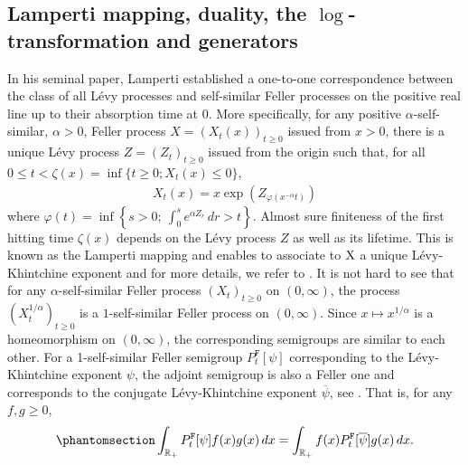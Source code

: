 \documentclass[12pt]{amsart}
\newcommand{\hlabel}{\phantomsection\label}
\numberwithin{equation}{section}
\newcommand{\bb}{\mathbb}
\renewcommand{\ge}{\geqslant}
\renewcommand{\le}{\leqslant}
\newcommand{\ov}{\overline}
\newcommand{\ttt}{\mathtt}
\theoremstyle{definition}
\theoremstyle{assump}
\theoremstyle{remark}
\begin{document}
 \subsection{Lamperti mapping, duality, the $\log$-transformation and generators} \hlabel{sec:lamp}
 In his seminal paper,  Lamperti \cite{Lamperti1972} established a one-to-one correspondence between the class of all L\'evy processes and self-similar Feller processes on the positive real line up to their absorption time at $0$. More specifically, for any positive $\alpha$-self-similar, $\alpha>0$, Feller process $X=(X_t(x))_{t\ge 0}$ issued from $x>0$, there is a unique L\'evy process $Z=(Z_t)_{t\ge 0}$ issued from the origin such that,  for all  $0\le t <\zeta(x)=\inf\{t\ge 0; X_t(x)\le 0\}$,
 \begin{align*}
 X_t(x)= x\exp(Z_{\varphi (x^{-\alpha}t)})
 \end{align*}
 where $  \varphi (t)=\inf\left\{s>0; \: \int_0^s e^{\alpha Z_r}\,dr>t\right\}$. Almost sure finiteness of the first hitting time $\zeta(x)$ depends on the L\'evy process $Z$ as well as its lifetime. This is known as the Lamperti mapping and enables to associate to ${\rm X}$ a unique L\'evy-Khintchine exponent and for more details, we refer to  \cite[Theorem 4.1]{Lamperti1972}. It is not hard to see that for any $\alpha$-self-similar Feller  process $(X_t)_{t\ge 0}$ on $(0,\infty)$, the process $( X^{1/\alpha}_t)_{t\ge 0}$ is a $1$-self-similar Feller process on $(0,\infty)$. Since $x\mapsto x^{1/\alpha}$ is a homeomorphism on $(0,\infty)$, the corresponding semigroups are similar to each other. For a 1-self-similar Feller semigroup ${P}^\ttt{F}_t[\psi]$ corresponding to the L\'evy-Khintchine exponent $\psi$, the adjoint semigroup is also a Feller one and corresponds to the conjugate L\'evy-Khintchine exponent $\ov{\psi}$, see \cite[Lemma 2]{BY02}. That is, for any $f,g\ge 0$,
 \begin{align} \hlabel{eq:adj}
 \int_{\bb{R}_+} {P}^\ttt{F}_t[\psi]f(x) g(x)\,dx=\int_{\bb{R}_+}f(x){P}^\ttt{F}_t[\ov{\psi}]g(x)\,dx.
 \end{align}
\end{document}
